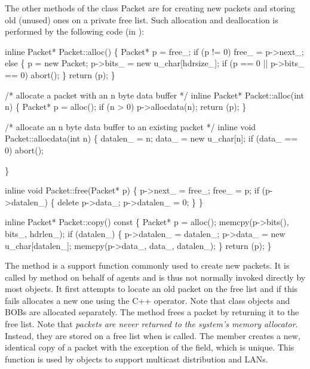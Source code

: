 The other methods of the class Packet are for creating new
packets and storing old (unused) ones on a private free list.
Such allocation and deallocation is performed by the
following code (in ):
\begin{program}
        inline Packet* Packet::alloc()
        \{
                Packet* p = free_;
                if (p != 0)
                        free_ = p->next_;
                else \{
                        p = new Packet;
                        p->bits_ = new u_char[hdrsize_];
                        if (p == 0 || p->bits_ == 0)
                                abort();
                \}
                return (p);
        \}

        /* {\cf allocate a packet with an n byte data buffer} */
        inline Packet* Packet::alloc(int n)
        \{
                Packet* p = alloc();
                if (n > 0)
                       p->allocdata(n);
                return (p);
        \}
                
        /* {\cf allocate an n byte data buffer to an existing packet} */
        inline void Packet::allocdata(int n)
        \{       
                datalen_ = n; 
                data_ = new u_char[n];
                if (data_ == 0)
                        abort();
         
        \}       

        inline void Packet::free(Packet* p)
        \{
                p->next_ = free_;
                free_ = p;
                if (p->datalen_) \{
                        delete p->data_;
                        p->datalen_ = 0;
                \}
        \}       
         
        inline Packet* Packet::copy() const
        \{               
                Packet* p = alloc();
                memcpy(p->bits(), bits_, hdrlen_);  
                if (datalen_) \{ 
                        p->datalen_ = datalen_;
                        p->data_ = new u_char[datalen_];
                        memcpy(p->data_, data_, datalen_);
                \}
                return (p);
        \}
\end{program}
The  method is a support function commonly
used to create new packets.
It is called by  method on
behalf of agents and is thus not normally invoked directly by most objects.
It first attempts to locate an old packet on the free list and
if this fails allocates a new one using the C++  operator.
Note that  class objects and BOBs are
allocated separately.
The  method frees a packet by returning it to the free
list.
Note that \emph{packets are never returned to the system's memory allocator}.
Instead, they are stored on a free list when  is called.
The  member creates a new, identical copy of a packet
with the exception of the  field, which is unique.
This function is used by  objects to support
multicast distribution and LANs.

